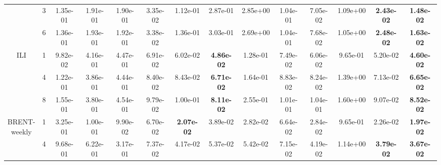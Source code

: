 \begin{table*}[!t]
{\begin{tabular}{cccccccccccccc}
                                     & 3                  & 1.35e-01                        & 1.91e-01                     & 1.90e-01                   & 3.35e-02                     & 1.12e-01          & 2.87e-01          & 2.85e+00 & 1.04e-01 & 7.05e-02          & 1.09e+00 & \textbf{2.43e-02} & \textbf{1.48e-02}\s \\ \cmidrule(l){3-14}
                                     & 6                  & 1.36e-01                        & 1.93e-01                     & 1.92e-01                   & 3.38e-02                     & 1.36e-01          & 3.03e-01          & 2.69e+00 & 1.04e-01 & 7.68e-02          & 1.05e+00 & \textbf{2.48e-02} & \textbf{1.63e-02}\s \\ \cmidrule(l){2-14}
            \multirow{3}{*}{ILI}     & 1                  & 9.82e-02                        & 4.16e-01                     & 4.47e-01                   & 6.91e-02                     & 6.02e-02          & \textbf{4.86e-02} & 1.28e-01 & 7.49e-02 & 6.06e-02          & 9.65e-01 & 5.20e-02          & \textbf{4.60e-02}\s \\ \cmidrule(l){3-14}
                                     & 4                  & 1.22e-01                        & 3.86e-01                     & 4.44e-01                   & 8.40e-02                     & 8.43e-02          & \textbf{6.71e-02} & 1.64e-01 & 8.83e-02 & 8.24e-02          & 1.39e+00 & 7.13e-02          & \textbf{6.65e-02}\s \\ \cmidrule(l){3-14}
                                     & 8                  & 1.55e-01                        & 3.80e-01                     & 4.54e-01                   & 9.79e-02                     & 1.00e-01          & \textbf{8.11e-02}\s & 2.55e-01 & 1.01e-01 & 1.04e-01          & 1.60e+00 & 9.07e-02          & \textbf{8.52e-02} \\ \cmidrule(l){2-14}
            \multirowcell{3}{BRENT-\\weekly} & 1                  & 3.25e-01                        & 1.00e-01                     & 9.90e-02                   & 6.70e-02                     & \textbf{2.07e-02} & 3.89e-02          & 2.82e-02 & 6.64e-02 & 2.84e-02          & 9.65e-01 & 2.26e-02          & \textbf{1.97e-02}\s \\ \cmidrule(l){3-14}
                                     & 4                  & 9.68e-01                        & 6.22e-01                     & 3.17e-01                   & 7.37e-02                     & 4.17e-02          & 5.37e-02          & 5.42e-02 & 7.15e-02 & 4.19e-02 & 1.14e+00 & \textbf{3.79e-02}          & \textbf{3.67e-02}\s\\ \cmidrule(l){3-14}

\end{tabular}}
\end{table*}
